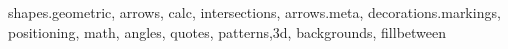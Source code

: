 
\usepackage{xcolor}
\usepackage{graphicx}
\usepackage{ifthen}
\usepackage{xifthen}

\usepackage{amssymb,amsmath,amsthm}

\usepackage{pgfplots}


\usepackage{pgf,pgffor}


\newcommand{\Vector}[1]{\underline{\mathbf{#1}}}%
\newcommand{\Matrix}[1]{\underline{\underline{{\mathbf{#1}}}}}

\usepackage{tikz}
\usepackage{tkz-euclide}
\usetikzlibrary
    {
      shapes.geometric,
      arrows,
      calc,
      intersections,
      arrows.meta,
      decorations.markings,
      positioning,
      math,
      angles,
      quotes,
      patterns,3d,
      backgrounds,
      fillbetween
    }

\makeatletter
\newcommand{\gettikzxy}[3]{%
  \tikz@scan@one@point\pgfutil@firstofone#1\relax
  \edef#2{\the\pgf@x}%
  \edef#3{\the\pgf@y}%
  \pgfmathparse{#2/28.4527} \let#2\pgfmathresult;
  \pgfmathparse{#3/28.4527} \let#3\pgfmathresult;
}
\makeatother
\pgfplotsset{compat=1.14}


